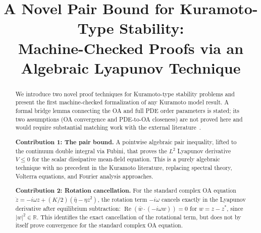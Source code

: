 \documentclass[11pt,a4paper]{article}
\title{A Novel Pair Bound for Kuramoto-Type Stability:\\
Machine-Checked Proofs via an Algebraic Lyapunov Technique}
\author{}
\date{}
\theoremstyle{definition}
\DeclareMathOperator{\re}{Re}
\newcommand{\R}{\mathbb{R}}
\begin{document}
\maketitle

\begin{abstract}
We introduce two novel proof techniques for Kuramoto-type stability problems and present the first machine-checked formalization of any Kuramoto model result. A formal bridge lemma connecting the OA and full PDE order parameters is stated; its two assumptions (OA convergence and PDE-to-OA closeness) are not proved here and would require substantial matching work with the external literature~\cite{dietert2017,dietert-fernandez2018}.

\textbf{Contribution 1: The pair bound.} A pointwise algebraic pair inequality, lifted to the continuum double integral via Fubini, that proves the $L^2$ Lyapunov derivative $\dot V \leq 0$ for the scalar dissipative mean-field equation. This is a purely algebraic technique with no precedent in the Kuramoto literature, replacing spectral theory, Volterra equations, and Fourier analysis approaches.

\textbf{Contribution 2: Rotation cancellation.} For the standard complex OA equation $\dot z = -i\omega z + (K/2)(\bar\eta - \eta z^2)$, the rotation term $-i\omega$ cancels exactly in the Lyapunov derivative after equilibrium subtraction: $\re(\bar w \cdot (-i\omega w)) = 0$ for $w = z - z^*$, since $|w|^2 \in \R$. This identifies the exact cancellation of the rotational term, but does not by itself prove convergence for the standard complex OA equation.


\end{abstract}
\end{document}
